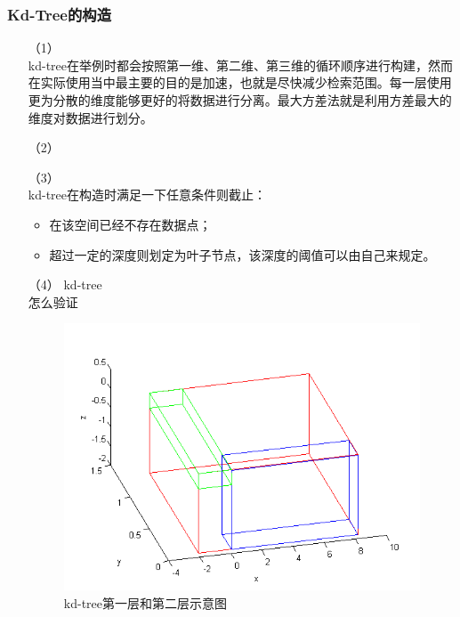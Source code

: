 \documentclass[10pt]{article}
\begin{document}
\subsubsection{Kd-Tree的构造}
\begin{itemize}
\item[（1）]{} \mbox{} \\
kd-tree在举例时都会按照第一维、第二维、第三维的循环顺序进行构建，然而在实际使用当中最主要的目的是加速，也就是尽快减少检索范围。每一层使用更为分散的维度能够更好的将数据进行分离。最大方差法就是利用方差最大的维度对数据进行划分。
\item[（2）]{}
\item[（3）]{} \mbox{} \\
kd-tree在构造时满足一下任意条件则截止：
\begin{itemize}
\item{在该空间已经不存在数据点；}
\item{超过一定的深度则划定为叶子节点，该深度的阈值可以由自己来规定。}
\end{itemize}

\item[（4）]{kd-tree} \mbox{} \\
怎么验证
\begin{figure}[H]
\begin{center}
\includegraphics[scale=0.5]{kd-tree-structure.png}
\caption{kd-tree第一层和第二层示意图}
\end{center}
\end{figure}
\end{itemize}
\end{document}
